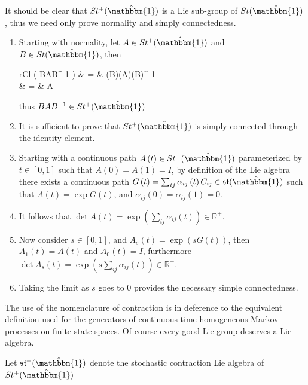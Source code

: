 \begin{IEEEproof}
	It should be clear that $St^{+}(\hat{\mathbbm{1}})$ is a Lie sub-group of $St(\hat{\mathbbm{1}})$,
	thus we need only prove normality and simply connectedness.
	\begin{enumerate}
		\item Starting with normality, let $A \in St^{+}(\hat{\mathbbm{1}})$ and $B \in St(\hat{\mathbbm{1}})$,
		then
		\begin{IEEEeqnarray*}{rCl}
			\det \left( BAB^{-1} \right)
				& = & \left(\det B\right)\left(\det A\right)\left(\det B\right)^{-1}\\
				& = & \det A
		\end{IEEEeqnarray*}
		thus $BAB^{-1} \in St^{+}(\hat{\mathbbm{1}})$
		\item It is sufficient to prove that $St^{+}(\hat{\mathbbm{1}})$ is simply
		connected through the identity element.
		\item Starting with a continuous path $A\left(t\right) \in St^{+}(\hat{\mathbbm{1}})$
		parameterized by $t \in \left[0,1\right]$ such that $A\left(0\right) = A\left(1\right) = I$,
		by definition of the Lie algebra there exists a continuous path $G\left(t \right) = \sum_{ij} \alpha_{ij}\left(t\right) C_{ij} \in \mathfrak{st}(\hat{\mathbbm{1}})$ 
		such that $A\left(t\right) = \exp G\left(t\right)$, and $\alpha_{ij}\left(0\right) = \alpha_{ij}\left(1\right) = 0$.
		\item It follows that $\det A\left(t\right) = \exp\left(\sum_{ij} \alpha_{ij}\left(t\right)\right) \in \mathbb{R}^{+}$.
		\item Now consider $s \in \left[0,1\right]$, and $A_s\left(t\right) = \exp\left(sG\left(t\right)\right)$,
		then $A_1\left(t\right) = A\left(t\right)$ and $A_0\left(t\right) = I$,
		furthermore $\det A_s\left(t\right) = \exp\left(s \sum_{ij} \alpha_{ij}\left(t\right)\right) \in \mathbb{R}^{+}$.
		\item Taking the limit as $s$ goes to $0$ provides the necessary simple 
		connectedness.\hfill\IEEEQEDhere
	\end{enumerate}
\end{IEEEproof}

The use of the nomenclature of contraction is in deference to the equivalent
definition used for the generators of continuous time homogeneous Markov 
processes on finite state spaces. Of course every good Lie group deserves a Lie 
algebra.

\begin{definition}
	Let $\mathfrak{st}^{+}(\hat{\mathbbm{1}})$ denote the stochastic contraction Lie 
	algebra of $St^{+}(\hat{\mathbbm{1}})$
\end{definition}

